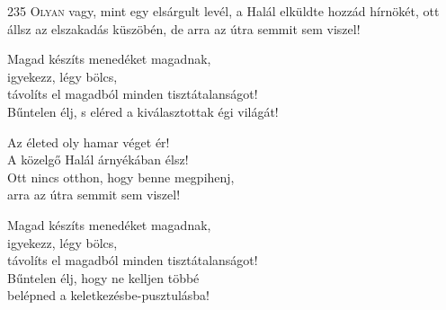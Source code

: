 
\vspace*{-\baselineskip}

\begin{firstdhpverse}[1pt]{235}
\lettrine{O}{lyan} {\LettrineTextFont vagy, mint egy elsárgult levél,}\newline
a Halál elküldte hozzád hírnökét,\newline
ott állsz az elszakadás küszöbén,\newline
de arra az útra semmit sem viszel!
\end{firstdhpverse}

\begin{dhpverse}

 Magad készíts menedéket magadnak,\\
igyekezz, légy bölcs,\\
távolíts el magadból minden tisztátalanságot!\\
Bűntelen élj, s eléred a kiválasztottak égi világát!

 Az életed oly hamar véget ér!\\
A közelgő Halál árnyékában élsz!\\
Ott nincs otthon, hogy benne megpihenj,\\
arra az útra semmit sem viszel!

 Magad készíts menedéket magadnak,\\
igyekezz, légy bölcs,\\
távolíts el magadból minden tisztátalanságot!\\
Bűntelen élj, hogy ne kelljen többé\\
belépned a keletkezésbe-pusztulásba!

\end{dhpverse}
\newpage
